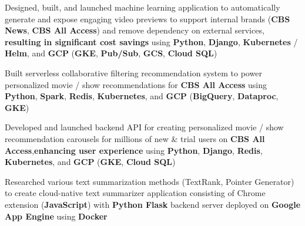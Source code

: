 \begin{cventries}
{\begin{cvitems}
            \item {Designed, built, and launched machine learning application to automatically generate and expose engaging video previews to support internal brands (\textbf{CBS News}, \textbf{CBS All Access}) and remove dependency on external services, \textbf{resulting in significant cost savings} using \textbf{Python}, \textbf{Django}, \textbf{Kubernetes} / \textbf{Helm}, and \textbf{GCP} (\textbf{GKE}, \textbf{Pub/Sub}, \textbf{GCS}, \textbf{Cloud SQL})}
 		\item {Built serverless collaborative filtering recommendation system to power personalized movie / show recommendations for \textbf{CBS All Access} using \textbf{Python}, \textbf{Spark}, \textbf{Redis}, \textbf{Kubernetes}, and \textbf{GCP} (\textbf{BigQuery}, \textbf{Dataproc}, \textbf{GKE})}
        \item {Developed and launched backend API for creating personalized movie / show recommendation carousels for millions of new \& trial users on \textbf{CBS All Access},\textbf{enhancing user experience} using \textbf{Python}, \textbf{Django}, \textbf{Redis}, \textbf{Kubernetes}, and \textbf{GCP} (\textbf{GKE}, \textbf{Cloud SQL})}
  		\item {Researched various text summarization methods (TextRank, Pointer Generator) to create cloud-native text summarizer application consisting of Chrome extension (\textbf{JavaScript}) with \textbf{Python Flask} backend server deployed on \textbf{Google App Engine} using \textbf{Docker}}

\end{cvitems}}
\end{cventries}
